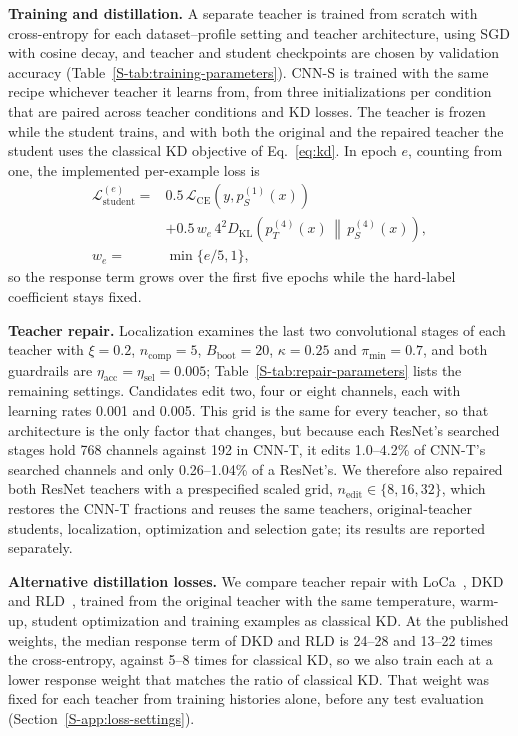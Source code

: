 \documentclass[10pt,journal,compsoc]{IEEEtran}
\theoremstyle{definition}
\begin{document}
\textbf{Training and distillation.} A separate teacher is trained from
scratch with cross-entropy for each dataset--profile setting and teacher
architecture, using SGD with cosine decay, and teacher and student
checkpoints are chosen by validation accuracy
(Table~\ref{S-tab:training-parameters}). CNN-S is trained with the same
recipe whichever teacher it learns from, from three initializations per
condition that are paired across teacher conditions and KD losses. The
teacher is frozen while the student trains, and with both the original
and the repaired teacher the student uses the classical KD objective of
Eq.~\eqref{eq:kd}. In epoch $e$, counting from one, the implemented
per-example loss is
\begin{equation}
\label{eq:experimental-kd-loss}
\begin{aligned}
\mathcal L_{\mathrm{student}}^{(e)}={}&
0.5\,\mathcal L_{\mathrm{CE}}\!\left(y,p_S^{(1)}(x)\right)\\
&+0.5\,w_e\,4^2 D_{\mathrm{KL}}\!\left(
p_T^{(4)}(x)\,\middle\|\,p_S^{(4)}(x)\right),\\
w_e={}&\min\{e/5,1\},
\end{aligned}
\end{equation}
so the response term grows over the first five epochs while the
hard-label coefficient stays fixed.

\textbf{Teacher repair.} Localization examines the last two
convolutional stages of each teacher with $\xi=0.2$,
$n_{\mathrm{comp}}=5$, $B_{\mathrm{boot}}=20$, $\kappa=0.25$ and
$\pi_{\min}=0.7$, and both guardrails are
$\eta_{\mathrm{acc}}=\eta_{\mathrm{sel}}=0.005$;
Table~\ref{S-tab:repair-parameters} lists the remaining settings.
Candidates edit two, four or eight channels, each with learning rates
0.001 and 0.005. This grid is the same for every teacher, so that
architecture is the only factor that changes, but because each ResNet's
searched stages hold 768 channels against 192 in CNN-T, it edits
1.0--4.2\% of CNN-T's searched channels and only 0.26--1.04\% of a
ResNet's. We therefore also repaired both ResNet teachers with a
prespecified scaled grid, $n_{\mathrm{edit}}\in\{8,16,32\}$, which
restores the CNN-T fractions and reuses the same teachers,
original-teacher students, localization, optimization and selection
gate; its results are reported separately.

\textbf{Alternative distillation losses.} We compare teacher repair with
LoCa~\cite{yang2024loca}, DKD~\cite{zhao2022decoupled} and
RLD~\cite{sun2025knowledge}, trained from the original teacher with the
same temperature, warm-up, student optimization and training examples as
classical KD. At the published weights, the median response term of DKD
and RLD is 24--28 and 13--22 times the cross-entropy, against 5--8 times
for classical KD, so we also train each at a lower response weight that
matches the ratio of classical KD. That weight was fixed for each teacher
from training histories alone, before any test evaluation
(Section~\ref{S-app:loss-settings}).
\end{document}
